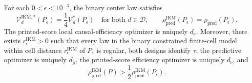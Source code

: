 For each \(0<\epsilon<10^{-3}\), the binary center law satisfies
\[
 \mathcal V_d^{\mathrm{IKM},*}(P_\epsilon)
 =\frac14\mathcal V_d^*(P_\epsilon)
 \quad\text{for both }d\in\mathcal D,
 \qquad
 \rho_{\mathrm{pred}}^{\mathrm{IKM}}(P_\epsilon)
 =\rho_{\mathrm{pred}}(P_\epsilon).
\]
The printed-score local causal-efficiency optimizer is uniquely \(d_{\mathrm e}\). Moreover, there exists \(r_\epsilon^{\mathrm{IKM}}>0\) such that every law in the binary constrained finite-cell model within cell distance \(r_\epsilon^{\mathrm{IKM}}\) of \(P_\epsilon\) is regular, both designs identify \(\tau\), the predictive optimizer is uniquely \(d_{\mathrm p}\), the printed-score efficiency optimizer is uniquely \(d_{\mathrm e}\), and
\[
 \rho_{\mathrm{pred}}^{\mathrm{IKM}}(P)
 >\frac12\rho_{\mathrm{pred}}^{\mathrm{IKM}}(P_\epsilon).
\]